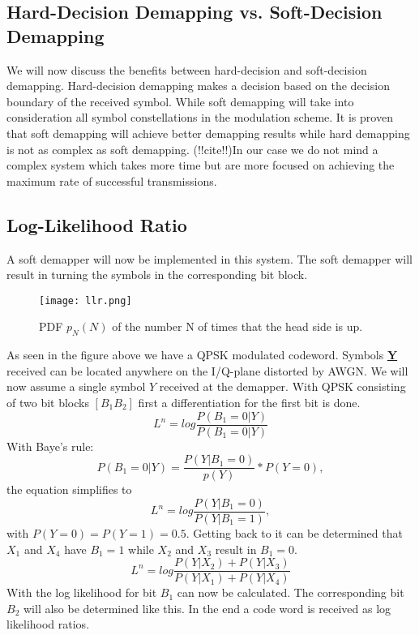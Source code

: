 \subsection{Hard-Decision Demapping vs. Soft-Decision Demapping}
We will now discuss the benefits between hard-decision and soft-decision demapping. Hard-decision demapping makes a decision based on the decision boundary of the received symbol. While soft demapping will take into consideration all symbol constellations in the modulation scheme.
It is proven that soft demapping will achieve better demapping results while hard demapping is not as complex as soft demapping. (!!cite!!)In our case we do not mind a complex system which takes more time but are more focused on achieving the maximum rate of successful transmissions.
\newpage
\subsection{Log-Likelihood Ratio}
A soft demapper will now be implemented in this system. The soft demapper will result in turning the symbols in the corresponding bit block.
\begin{figure}[!htb]
    \centering
    \texttt{[image: llr.png]}
    \caption{PDF $p_N(N)$ of the number N of times that the head side is up.}
    \label{fig:llr}
\end{figure}
\newline
As seen in the figure above we have a \gls{QPSK} modulated codeword. Symbols \textbf{\underline{Y}} received can be located anywhere on the I/Q-plane distorted by AWGN. We will now assume a single symbol $Y$ received at the demapper.
With QPSK consisting of two bit blocks $[B_1B_2]$ first a differentiation for the first bit is done.
\begin{equation}
\label{eq:llr1}
L^n = log\frac{P(B_1=0|Y)}{P(B_1=0|Y)}
\end{equation}
With Baye's rule:
\begin{equation}
\label{eq:bl}
P(B_1=0|Y) = \frac{P(Y|B_1=0)}{p(Y)}*P(Y=0),
\end{equation}
the equation simplifies to 
\begin{equation}
L^n = log\frac{P(Y|B_1=0)}{P(Y|B_1=1)},
\end{equation}
with $P(Y=0)=P(Y=1)=0.5$.
Getting back to  it can be determined that $X_1$ and $X_4$ have $B_1=1$ while $X_2$ and $X_3$ result in $B_1=0$.
\begin{equation}
L^n = log\frac{P(Y|X_2)+P(Y|X_3)}{P(Y|X_1)+P(Y|X_4)}
\end{equation}
With  the log likelihood for bit $B_1$ can now be calculated. The corresponding bit $B_2$ will also be determined like this. In the end a code word is received as log likelihood ratios.
